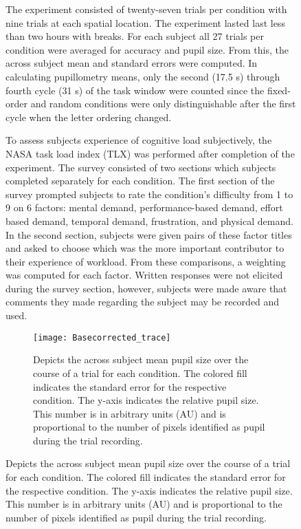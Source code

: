 \documentclass[10pt]{article}
\begin{document}
\begin{figure}
The experiment consisted of twenty-seven trials per condition
with nine trials at each spatial location.  The experiment
lasted last less than two hours with breaks.   For each
subject all 27 trials per condition were averaged for accuracy
and pupil size.  From this, the across subject mean and
standard errors were computed.  In calculating pupillometry
means, only the second (17.5 s) through fourth cycle (31 s) of
the task window were counted since the fixed-order and random
conditions were only distinguishable after the first cycle
when the letter ordering changed.

To assess subjects experience of cognitive load subjectively,
the NASA task load index (TLX) was performed after completion
of the experiment\cite{kubler}.  The survey consisted of two
sections which subjects completed separately for each
condition.  The first section of the survey prompted subjects
to rate the condition's difficulty from 1 to 9 on 6 factors:
mental demand, performance-based demand, effort based demand,
temporal demand, frustration, and physical demand. In the
second section, subjects were given pairs of these factor
titles and asked to choose which was the more important
contributor to their experience of workload.  From these
comparisons, a weighting was computed for each factor.
Written responses were not elicited during the survey section,
however, subjects were made aware that comments they made
regarding the subject may be recorded and used.




\begin{figure}[t]
  \centering
  \texttt{[image: Basecorrected\_trace]}
  \caption{Depicts the across subject mean pupil size over the course of a trial
  for each condition.  The colored fill indicates the standard error
  for the respective condition.  The y-axis indicates the
  relative pupil size.  This number is in arbitrary units (AU) and
  is proportional to the number of pixels identified as pupil during
  the trial recording.}
  \label{trialtrace}
\end{figure}


\end{figure}
\end{document}
